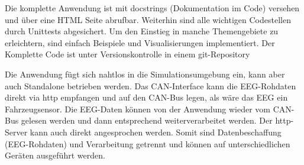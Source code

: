 Die komplette Anwendung ist mit docstrings (Dokumentation im Code) versehen und über eine HTML Seite abrufbar. Weiterhin sind alle wichtigen Codestellen durch Unittests abgesichert. Um den Einstieg in manche Themengebiete zu erleichtern, sind einfach Beispiele und Visualisierungen implementiert. Der Komplette Code ist unter Versionskontrolle in einem git-Repository

Die Anwendung fügt sich nahtlos in die Simulationsumgebung ein, kann aber auch Standalone betrieben werden. Das CAN-Interface kann die EEG-Rohdaten direkt via http empfangen und auf den CAN-Bus legen, als wäre das EEG ein Fahrzeugsensor. Die EEG-Daten können von der Anwendung wieder vom CAN-Bus gelesen werden und dann entsprechend weiterverarbeitet werden. Der http-Server kann auch direkt angesprochen werden. Somit sind Datenbeschaffung (EEG-Rohdaten) und Verarbeitung getrennt und können auf unterschiedlichen Geräten ausgeführt werden.